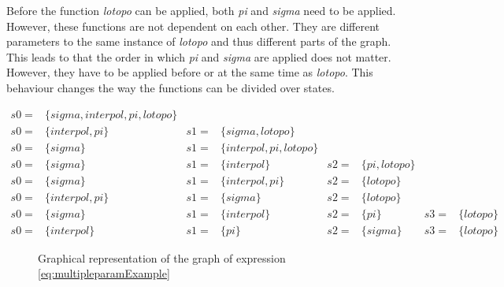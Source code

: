 \documentclass{article}
\begin{document}
Before the function \textit{lotopo} can be applied, both \textit{pi} and \textit{sigma} need to be applied. However, these functions are not dependent on each other. They are different parameters to the same instance of \textit{lotopo} and thus different parts of the graph. This leads to that the order in which \textit{pi} and \textit{sigma} are applied does not matter. However, they have to be applied before or at the same time as \textit{lotopo}. This behaviour changes the way the functions can be divided over states.

\begin{align}
   s0=& \{sigma,interpol,pi,lotopo\} &   &                 &   &   \\
   s0=& \{interpol,pi\}          & s1=& \{sigma,lotopo\}    &   &   \\
   s0=& \{sigma\}  & s1=&\{interpol,pi,lotopo \} \\
   s0=& \{sigma\} & s1=&\{ interpol\} & s2=&\{pi,lotopo \} \\
   s0=& \{sigma\} & s1=&\{ interpol,pi\} & s2=&\{lotopo \} \\
   s0=& \{interpol,pi\} & s1=&\{sigma \} & s2=&\{lotopo \} \\
   s0=& \{sigma\} & s1=&\{ interpol\} & s2=&\{pi\} & s3=&\{lotopo \} \\
   s0=&\{ interpol\}& s1=&\{pi\} &s2=& \{sigma\} & s3=&\{lotopo \}
\end{align}

 \begin{figure}
    \centering
   
    
    \caption{Graphical representation of the graph of expression \ref{eq:multipleparamExample}}
    \label{fig:smallGataGraph2}
\end{figure}
 
\end{document}
